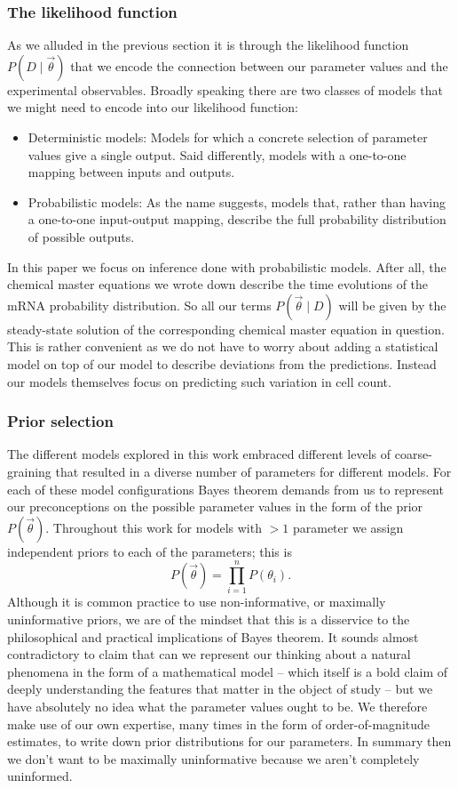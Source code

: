 \subsubsection{The likelihood function}

As we alluded in the previous section it is through the likelihood function 
$P(D \mid \vec{\theta})$ that we encode the connection between our parameter 
values and the experimental observables. Broadly speaking there are two classes
of models that we might need to encode into our likelihood function:
\begin{itemize}
        \item Deterministic models: Models for which a concrete selection of
        parameter values give a single output. Said differently, models 
        with a one-to-one mapping between inputs and outputs.
        \item Probabilistic models: As the name suggests, models that, rather than
        having a one-to-one input-output mapping, describe the full
        probability distribution of possible outputs.
\end{itemize}
In this paper we focus on inference done with probabilistic models. After all,
the chemical master equations we wrote down describe the time evolutions of the
mRNA probability distribution. So all our terms $P(\vec{\theta} \mid D)$ will be
given by the steady-state solution of the corresponding chemical master equation
in question. This is rather convenient as we do not have to worry about adding a
statistical model on top of our model to describe deviations from the
predictions. Instead our models themselves focus on predicting such variation
in cell count.

\subsubsection{Prior selection}
The different models explored in this work embraced different levels of
coarse-graining that resulted in a diverse number of parameters for different
models. For each of these model configurations Bayes theorem demands from us to
represent our preconceptions on the possible parameter values in the form of the
prior $P(\vec{\theta})$. Throughout this work for models with $> 1$ parameter we
assign independent priors to each of the parameters; this is
\begin{equation}
P(\vec{\theta}) = \prod_{i=1}^n P(\theta_i).
\end{equation}
Although it is common practice to use non-informative, or maximally
uninformative priors, we are of the mindset that this is a disservice to the
philosophical and practical implications of Bayes theorem. It sounds almost
contradictory to claim that can we represent our thinking about a natural
phenomena in the form of a mathematical model -- which itself is a bold claim of
deeply understanding the features that matter in the object of study -- but we
have absolutely no idea what the parameter values ought to be. We therefore make
use of our own expertise, many times in the form of order-of-magnitude
estimates, to write down prior distributions for our parameters. In summary then
we don’t want to be maximally uninformative because we aren’t completely
uninformed.

